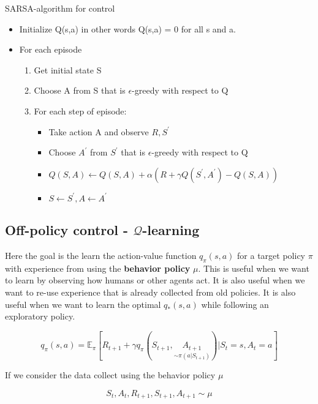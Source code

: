 \begin{wbox}{SARSA-algorithm for control}
\begin{itemize}
	\item Initialize Q(s,a) in other words Q(s,a) = 0 for all s and a.
	\item For each episode
		\begin{enumerate}
			\item Get initial state S
			\item Choose A from S that is $\epsilon$-greedy with respect to Q
			\item For each step of episode:
			\begin{itemize}
				\item Take action A and observe $R,S^{\prime}$
				\item Choose $A^{\prime}$ from $S^{\prime}$ that is $\epsilon$-greedy with respect to Q
				\item $Q(S,A) \leftarrow Q(S,A) + \alpha (R + \gamma Q(S^{\prime}, A^{\prime}) - Q(S,A)) $
				\item $S \leftarrow S^{\prime}, A \leftarrow A^{\prime} $
			\end{itemize}
		\end{enumerate}
\end{itemize}
\end{wbox}

\subsection*{Off-policy control - $\mathcal{Q}$-learning}
Here the goal is the learn the action-value function $q_\pi(s,a)$ for a target policy $\pi$ with experience from using the \textbf{behavior policy} $\mu$. This is useful when we want to learn by observing how humans or other agents act. It is also useful when we want to re-use experience that is already collected from old policies. It is also useful when we want to learn the optimal $q_*(s,a)$ while following an exploratory policy.

	\begin{equation}
	 	q_\pi(s,a) = \mathbb{E}_\pi \left[ R_{t+1} + \gamma q_\pi(S_{t+1}, \underset{\sim \pi (a|S_{t+1})}{A_{t+1}}) | S_t=s, A_t = a \right]
	 \end{equation} 

If we consider the data collect using the behavior policy $\mu$ 

	\begin{equation}
		S_t,A_t,R_{t+1},S_{t+1},A_{t+1} \sim \mu
	\end{equation}

